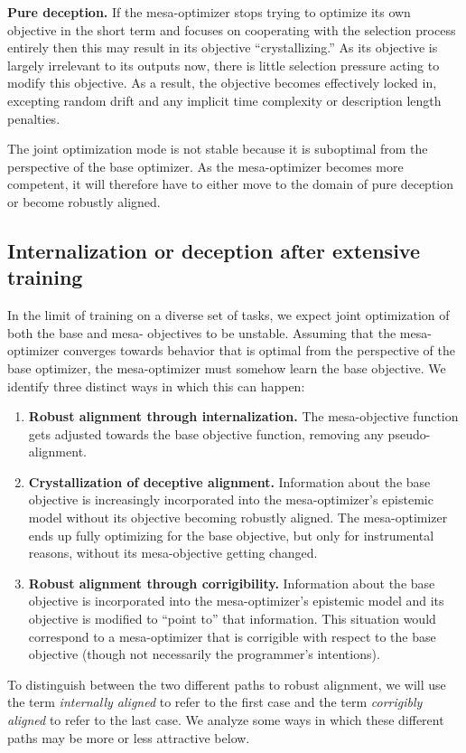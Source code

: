 \documentclass[
  onecolumn,
  natbib,
]{miri-tech-article}
\begin{document}
\textbf{Pure deception.} If the mesa-optimizer stops trying to optimize its own objective in the short term and focuses on cooperating with the selection process entirely then this may result in its objective ``crystallizing.'' As its objective is largely irrelevant to its outputs now, there is little selection pressure acting to modify this objective. As a result, the objective becomes effectively locked in, excepting random drift and any implicit time complexity or description length penalties.

The joint optimization mode is not stable because it is suboptimal from the perspective of the base optimizer. As the mesa-optimizer becomes more competent, it will therefore have to either move to the domain of pure deception or become robustly aligned.

\subsection{Internalization or deception after extensive training}
\label{sec:4.4}

In the limit of training on a diverse set of tasks, we expect joint optimization of both the base and mesa- objectives to be unstable. Assuming that the mesa-optimizer converges towards behavior that is optimal from the perspective of the base optimizer, the mesa-optimizer must somehow learn the base objective. We identify three distinct ways in which this can happen:
\begin{enumerate}
\item \textbf{Robust alignment through internalization.} The mesa-objective function gets adjusted towards the base objective function, removing any pseudo-alignment.
\item \textbf{Crystallization of deceptive alignment.} Information about the base objective is increasingly incorporated into the mesa-optimizer's epistemic model without its objective becoming robustly aligned. The mesa-optimizer ends up fully optimizing for the base objective, but only for instrumental reasons, without its mesa-objective getting changed.
\item \textbf{Robust alignment through corrigibility.} Information about the base objective is incorporated into the mesa-optimizer's epistemic model and its objective is modified to ``point to'' that information. This situation would correspond to a mesa-optimizer that is corrigible\cite{corrigibility} with respect to the base objective (though not necessarily the programmer's intentions).
\end{enumerate}
To distinguish between the two different paths to robust alignment, we will use the term \textit{internally aligned} to refer to the first case and the term \textit{corrigibly aligned} to refer to the last case. We analyze some ways in which these different paths may be more or less attractive below.
\end{document}
